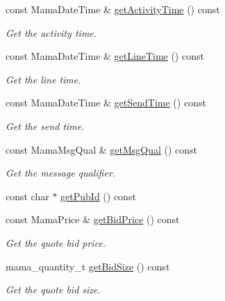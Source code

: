 \begin{CompactItemize}
const Mama\-Date\-Time \& \hyperlink{classWombat_1_1MamdaQuoteListener_367521366aaadbe118e70ab32508d7c4}{get\-Activity\-Time} () const 
\begin{CompactList}\small\item\em Get the activity time. \item\end{CompactList}\item 
const Mama\-Date\-Time \& \hyperlink{classWombat_1_1MamdaQuoteListener_4aa61f82eb9452a38d2c483a5626b8b1}{get\-Line\-Time} () const 
\begin{CompactList}\small\item\em Get the line time. \item\end{CompactList}\item 
const Mama\-Date\-Time \& \hyperlink{classWombat_1_1MamdaQuoteListener_3937e363870aeca07238a7253653ee6a}{get\-Send\-Time} () const 
\begin{CompactList}\small\item\em Get the send time. \item\end{CompactList}\item 
const Mama\-Msg\-Qual \& \hyperlink{classWombat_1_1MamdaQuoteListener_3350ee73b06ee1e205b280b070cea298}{get\-Msg\-Qual} () const 
\begin{CompactList}\small\item\em Get the message qualifier. \item\end{CompactList}\item 
const char $\ast$ \hyperlink{classWombat_1_1MamdaQuoteListener_1ba9fa01139733d0011380af2ae8bd96}{get\-Pub\-Id} () const 
\item 
const Mama\-Price \& \hyperlink{classWombat_1_1MamdaQuoteListener_af4b7f010c56303476dc4de64fa0b3f4}{get\-Bid\-Price} () const 
\begin{CompactList}\small\item\em Get the quote bid price. \item\end{CompactList}\item 
mama\_\-quantity\_\-t \hyperlink{classWombat_1_1MamdaQuoteListener_578f45a1ddaa18b8447cda08b943153e}{get\-Bid\-Size} () const 
\begin{CompactList}\small\item\em Get the quote bid size. \item\end{CompactList}\item 

\end{CompactItemize}
